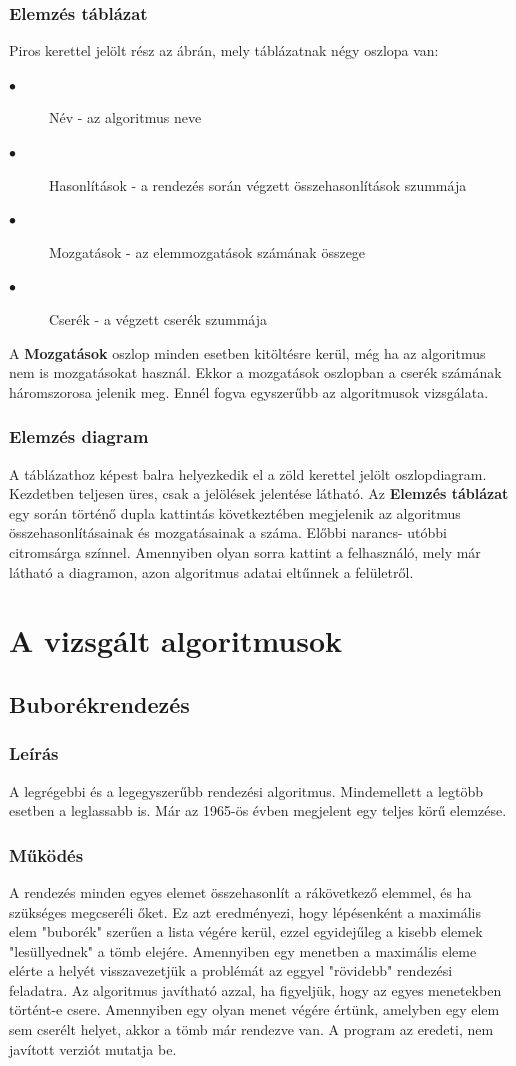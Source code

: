 \documentclass{elteikthesis}
\begin{document}
\subsubsection{Elemzés táblázat}
Piros kerettel jelölt rész az ábrán, mely táblázatnak négy oszlopa van:
\begin{description}
	\item[$\bullet$] Név - az algoritmus neve
	\item[$\bullet$] Hasonlítások - a rendezés során végzett összehasonlítások szummája
	\item[$\bullet$] Mozgatások - az elemmozgatások számának összege
	\item[$\bullet$] Cserék - a végzett cserék szummája
\end{description}
A \textbf{Mozgatások} oszlop minden esetben kitöltésre kerül, még ha az algoritmus nem is mozgatásokat használ. Ekkor a mozgatások oszlopban a cserék számának háromszorosa jelenik meg. Ennél fogva egyszerűbb az algoritmusok vizsgálata.
\subsubsection{Elemzés diagram}
A táblázathoz képest balra helyezkedik el a zöld kerettel jelölt oszlopdiagram. Kezdetben teljesen üres, csak a jelölések jelentése látható. Az \textbf{Elemzés táblázat} egy során történő dupla kattintás következtében megjelenik az algoritmus összehasonlításainak és mozgatásainak a száma. Előbbi narancs- utóbbi citromsárga színnel. Amennyiben olyan sorra kattint a felhasználó, mely már látható a diagramon, azon algoritmus adatai eltűnnek a felületről.

\section{A vizsgált algoritmusok}
\subsection{Buborékrendezés}
\subsubsection{Leírás}
A legrégebbi és a legegyszerűbb rendezési algoritmus. Mindemellett a legtöbb esetben a leglassabb is. Már az 1965-ös évben megjelent egy teljes körű elemzése\cite{Demuth}.
\subsubsection{Működés}
 A rendezés minden egyes elemet összehasonlít a rákövetkező elemmel, és ha szükséges megcseréli őket. Ez azt eredményezi, hogy lépésenként a maximális elem "buborék" szerűen a lista végére kerül, ezzel egyidejűleg a kisebb elemek "lesüllyednek" a tömb elejére. Amennyiben egy menetben a maximális eleme elérte a helyét visszavezetjük a problémát az eggyel "rövidebb" rendezési feladatra\cite{Fekete}. Az algoritmus javítható azzal, ha figyeljük, hogy az egyes menetekben történt-e csere. Amennyiben egy olyan menet végére értünk, amelyben egy elem sem cserélt helyet, akkor a tömb már rendezve van. A program az eredeti, nem javított verziót mutatja be.
\end{document}
